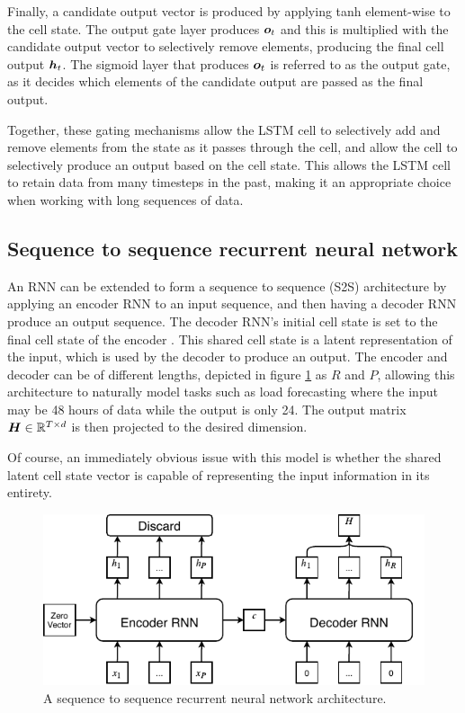 Finally, a candidate output vector is produced by applying tanh element-wise to the cell state.
The output gate layer produces ${\bm{o}}_t$ and this is multiplied with the candidate output vector to selectively remove elements, producing the final cell output ${\bm{h}}_t$.
The sigmoid layer that produces ${\bm{o}}_t$ is referred to as the output gate, as it decides which elements of the candidate output are passed as the final output.

Together, these gating mechanisms allow the LSTM cell to selectively add and remove elements from the state as it passes through the cell, and allow the cell to selectively produce an output based on the cell state.
This allows the LSTM cell to retain data from many timesteps in the past, making it an appropriate choice when working with long sequences of data.

\subsection{Sequence to sequence recurrent neural network}
\label{section-S2S}
An RNN can be extended to form a sequence to sequence (S2S) architecture by applying an encoder RNN to an input sequence, and then having a decoder RNN produce an output sequence.
The decoder RNN's initial cell state is set to the final cell state of the encoder \cite{Cho2014a}.
This shared cell state is a latent representation of the input, which is used by the decoder to produce an output.
The encoder and decoder can be of different lengths, depicted in figure \ref{fig:S2S} as $R$ and $P$, allowing this architecture to naturally model tasks such as load forecasting where the input may be 48 hours of data while the output is only 24.
The output matrix ${\bm{H}} \in \mathbb{R}^{T \times d}$ is then projected to the desired dimension.

Of course, an immediately obvious issue with this model is whether the shared latent cell state vector is capable of representing the input information in its entirety.

\begin{figure}[htbp]
	\centerline{\includegraphics[trim=0 0cm 0 0, width=.75\textwidth]{images/S2S.pdf}}
	\caption{A sequence to sequence recurrent neural network architecture.}
	\label{fig:S2S}
\end{figure}

